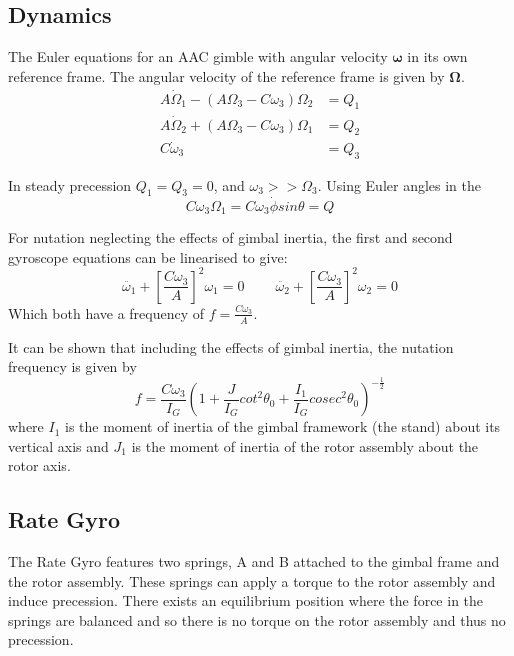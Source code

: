 \documentclass[8pt]{article}
\begin{document}
\subsection{Dynamics}

The Euler equations for an AAC gimble with angular velocity $\bm{\omega}$ in its own reference frame.
The angular velocity of the reference frame is given by $\bm{\Omega}$.
\begin{align}
    A\dot{\Omega}_1 - (A\Omega_3 - C \omega_3) \Omega_2 &= Q_1 \tag{A1}\\
    A\dot{\Omega}_2 + (A\Omega_3 - C\omega_3) \Omega_1 &= Q_2 \tag{A2} \\
    C\dot{\omega}_3 &= Q_3 \tag{A3}
\end{align}

In steady precession $Q_1 = Q_3 = 0$, and $\omega_3 >> \Omega_3$.
Using Euler angles in the 
\begin{equation}
    C\omega_3 \Omega_1 = C\omega_3 \dot{\phi} sin \theta = Q \tag{A4} \label{eq:A4}
\end{equation}

For nutation neglecting the effects of gimbal inertia, the first and second gyroscope equations can be linearised to give:
\begin{equation}
    \ddot{\omega_1} + \left[ \frac{C\omega_3}{A} \right]^2 \omega_1 = 0 \;\;\;\;\;\;\;\; \ddot{\omega_2} + \left[ \frac{C\omega_3}{A} \right]^2 \omega_2 = 0 \tag{A5}
\end{equation}
Which both have a frequency of $ f = \frac{C\omega_3}{A} $.

It can be shown that including the effects of gimbal inertia, the nutation frequency is given by
\begin{equation}
    f = \frac{C\omega_3}{I_G} \left( 1 + \frac{J}{I_G}cot^2\theta_0 + \frac{I_1}{I_G}cosec^2\theta_0 \right)^{-\frac{1}{2}} \tag{A7}
\end{equation}
where $I_1$ is the moment of inertia of the gimbal framework (the stand) about its vertical axis
and $J_1$ is the moment of inertia of the rotor assembly about the rotor axis.

\subsection{Rate Gyro}

The Rate Gyro features two springs, A and B attached to the gimbal frame and the rotor assembly.
These springs can apply a torque to the rotor assembly and induce precession.
There exists an equilibrium position where the force in the springs are balanced and so there is no torque on the rotor assembly and thus no precession.
\end{document}
